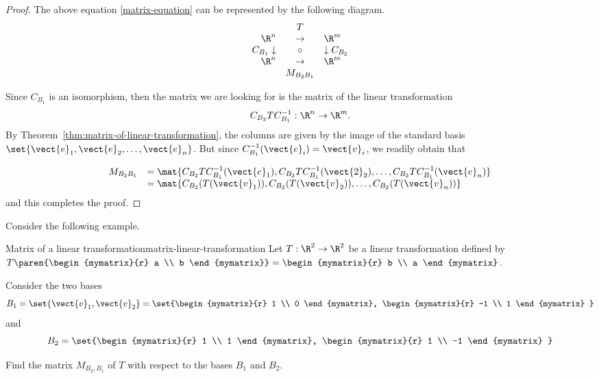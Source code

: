 \begin{proof}
The above equation {\eqref{matrix-equation}} can be represented by the following diagram.
\begin{equation*}
\begin{array}{rrcll}
&  & T &  &  \\
& \R^n & \rightarrow  & \R^m & \\
& C_{B_{1} }\downarrow  & \circ  & \downarrow C_{B_{2} } &  \\
& \R^{n} & \rightarrow  & \R^{m} &  \\
&  & M_{B_{2} B_{1} } &  &
\end{array}
\end{equation*}

Since $C_{B_1}$ is an isomorphism, then the matrix we are looking for is the matrix of the linear transformation
\[   C_{B_2} T C^{-1}_{B_1} : \R^n \to \R^m. \]
By Theorem~\ref{thm:matrix-of-linear-transformation}, the columns are
given by the image of the standard basis $\set{\vect{e}_1,
\vect{e}_2,\ldots, \vect{e}_n }$. But since $C^{-1}_{B_1}( \vect{e}_i) = \vect{v}_i$, we readily obtain that

\[ \begin{array}{ll}
M_{B_{2} B_{1}}
& = \mat{C_{B_2}T C^{-1}_{B_1} (\vect{e}_1), C_{B_2}T C^{-1}_{B_1} (\vect{2}_2), \ldots, C_{B_2}T C^{-1}_{B_1} (\vect{e}_n) } \\
& = \mat{C_{B_2}(T(\vect{v}_1)), C_{B_2}(T(\vect{v}_2)), \ldots, C_{B_2}(T(\vect{v}_n)) }
\end{array}\]
and this completes the proof.
\end{proof}

Consider the following example.

\begin{example}{Matrix of a linear transformation}{matrix-linear-transformation}
Let $T: \R^2 \to \R^2$ be a linear transformation defined by $T \paren{\begin{mymatrix}{r}
a \\
b
\end{mymatrix}} = \begin{mymatrix}{r}
b \\
a
\end{mymatrix}$.

Consider the two bases
\[
B_1 = \set{\vect{v}_{1}, \vect{v}_{2} } = \set{\begin{mymatrix}{r}
1 \\
0
\end{mymatrix}, \begin{mymatrix}{r}
-1 \\
1
\end{mymatrix}
}
\]
 and
\[
B_2 = \set{\begin{mymatrix}{r}
1 \\
1
\end{mymatrix}, \begin{mymatrix}{r}
1 \\
-1
\end{mymatrix}
}
\]

Find the matrix $M_{B_2,B_1}$ of $T$ with respect to the bases $B_1$ and $B_2$.
\end{example}

